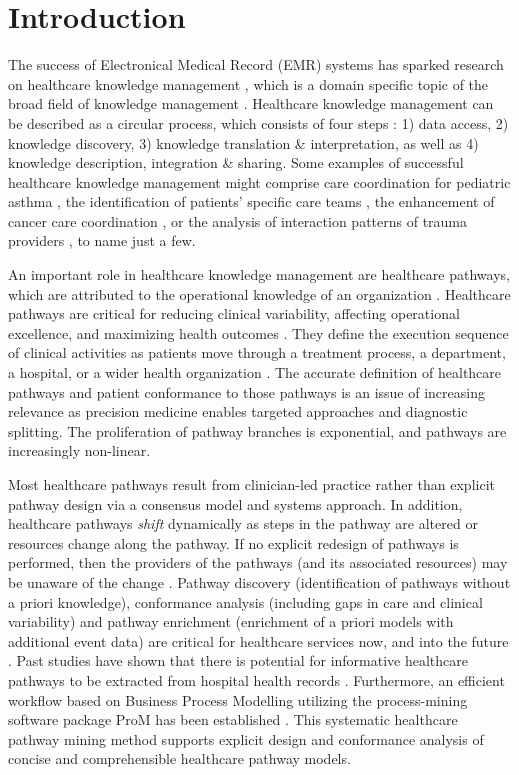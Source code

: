 \section{Introduction}
The success of Electronical Medical Record (EMR) systems has
sparked research on healthcare knowledge management
\cite{BaliDwivedi2007_KM, Haas2016_KM}, which is a domain specific
topic of the broad field of knowledge management \cite{NonakaTakeuchi1995_KM, KM_befluegelt}.
Healthcare knowledge management can be described as a circular process,
which consists of four steps \cite{Frize2007_KM}:
1) data access,
2) knowledge discovery,
3) knowledge translation \& interpretation, as well as
4) knowledge description, integration \& sharing.
Some examples of successful healthcare knowledge management might
comprise care coordination for pediatric asthma \cite{Janevic2017_pathways},
the identification of patients' specific care teams
\cite{Thornton2015_pathways}, the enhancement of cancer care coordination
\cite{Mayer2016_pathways}, or the analysis of interaction patterns of
trauma providers \cite{Malin2018_pathways}, to name just a few.

An important role in healthcare knowledge management are healthcare
pathways, which are attributed to the operational knowledge of an
organization \cite{Haas2016_KM}.
Healthcare pathways are critical for reducing clinical variability,
affecting operational excellence, and maximizing health outcomes
\cite{Lin2001}.
They define the execution sequence of clinical activities as patients
move through a treatment process, a department, a hospital, or a wider
health organization \cite{Huang2016}.
The accurate definition of healthcare pathways and patient conformance
to those pathways is an issue of increasing relevance as precision
medicine enables targeted approaches and diagnostic splitting.
The proliferation of pathway branches is exponential, and pathways are increasingly non-linear. 

Most healthcare pathways result from clinician-led practice rather
than explicit pathway design via a consensus model and systems
approach.
In addition, healthcare pathways \textit{shift} dynamically
as steps in the pathway are altered or resources change along the
pathway.
If no explicit redesign of pathways is performed, then the providers
of the pathways (and its associated resources) may be unaware of the
change \cite{Zhang2015}.
Pathway discovery (identification of pathways without a priori knowledge), conformance analysis (including gaps in care and clinical variability) and pathway enrichment (enrichment of a priori models with additional event data) are critical for healthcare services now, and into the future \cite{Baker2017}.
Past studies have shown that there is potential for informative
healthcare pathways to be extracted from hospital health records
\cite{Iwata2013, Xu2017, Yan2017_pathways}.
Furthermore, an efficient workflow based on
Business Process Modelling utilizing the process-mining software
package ProM \cite{VanDongen2005} has been established
\cite{Mans2015_pathways, QuintanoNeira2019_pathways}.
This systematic healthcare pathway mining method supports
explicit design and conformance analysis of concise and comprehensible
healthcare pathway models.

